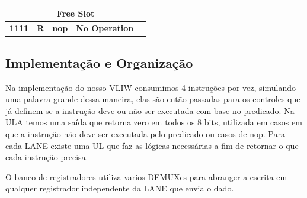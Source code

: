 \documentclass{article}
\begin{document}
\begin{table}[H]
\begin{tabular}{|c|*{4}{c|}}
        \multicolumn{5}{|c|}{\textbf{Free Slot}}                                                                                                                                                                                                                 \\ \hline 
        \multicolumn{1}{|c|}{\textbf{1111}}   & \multicolumn{1}{c|}{\textbf{R}}     & \multicolumn{1}{c|}{\textbf{nop}}       & \multicolumn{1}{c|}{\textbf{No Operation}}         & \multicolumn{1}{c|}{\textbf{}}                                              \\ \hline
      \end{tabular}
    \end{table}

    \subsection{Implementação e Organização}

    Na implementação do nosso VLIW consumimos 4 instruções por vez, simulando uma palavra grande dessa maneira, elas são então passadas para os controles que já definem se a instrução deve ou não ser executada com base no predicado.
    Na ULA temos uma saída que retorna zero em todos os 8 bits, utilizada em casos em que a instrução não deve ser executada pelo predicado ou casos de nop. Para cada LANE existe uma UL que faz as lógicas necessárias a fim de retornar o que cada instrução precisa.

    O banco de registradores utiliza varios DEMUXes para abranger a escrita em qualquer registrador independente da LANE que envia o dado.
\end{document}
